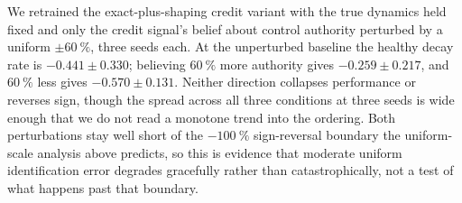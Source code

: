 We retrained the exact-plus-shaping credit variant with the true dynamics
held fixed and only the credit signal's belief about control authority
perturbed by a uniform $\pm\SI{60}{\percent}$, three seeds each. At the
unperturbed baseline the healthy decay rate is $-0.441\pm0.330$; believing
$\SI{60}{\percent}$ more authority gives $-0.259\pm0.217$, and
$\SI{60}{\percent}$ less gives $-0.570\pm0.131$. Neither direction collapses
performance or reverses sign, though the spread across all three conditions
at three seeds is wide enough that we do not read a monotone trend into the
ordering. Both perturbations stay well short of the $-\SI{100}{\percent}$
sign-reversal boundary the uniform-scale analysis above predicts, so this is
evidence that moderate uniform identification error degrades gracefully
rather than catastrophically, not a test of what happens past that
boundary.

